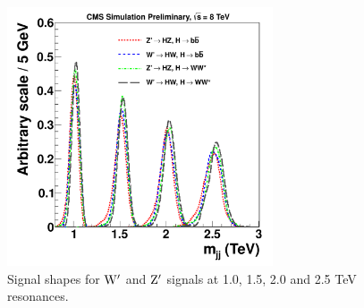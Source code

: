 \begin{figure}[ht!b]
\begin{center}
\includegraphics[width=0.7\textwidth]{EXO-14-009/shapeAll.pdf}
\end{center}
\caption{Signal shapes for ${\rm W'}$ and ${\rm Z'}$ signals at 1.0, 1.5, 2.0 and 2.5 TeV
 resonances.
}
\label{fig:HbbZqqShape}
\end{figure}






\clearpage

